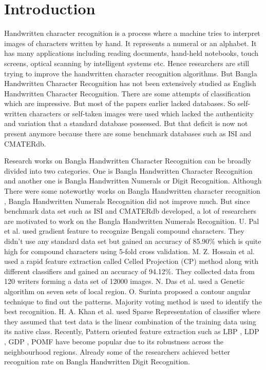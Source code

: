 \documentclass[conference]{IEEEtran}
\begin{document}
\IEEEpeerreviewmaketitle


\section{Introduction}
Handwritten character recognition is a process where a machine tries to interpret images of characters written by hand. It represents a numeral or an alphabet. It has many applications including reading documents, hand-held notebooks, touch screens, optical scanning by intelligent systems etc. Hence researchers are still trying to improve the handwritten character recognition algorithms. But Bangla Handwritten Character Recognition has not been extensively studied as English Handwritten Character Recognition. There are some attempts of classification which are impressive. But most of the papers earlier lacked databases. So self-written characters or self-taken images were used which lacked the authenticity and variation that a standard database possessed. But that deficit is now not present anymore because there are some benchmark databases such as ISI \cite{2006isi} and CMATERdb\cite{2009cmater}.


Research works on Bangla Handwritten Character Recognition can be broadly divided into two categories. One is Bangla Handwritten Character Recognition and another one is Bangla Handwritten Numerals or Digit Recognition. Although There were some noteworthy works on Bangla Handwritten character recognition \cite{1998BHCR, 2004BHCR}, Bangla Handwritten Numerals Recognition did not improve much. But since benchmark data set such as ISI \cite{2006isi} and CMATERdb \cite{2009cmater} developed, a lot of researchers are motivated to work on the Bangla Handwritten Numerals Recognition. U. Pal et al. \cite{2007gradientfeature} used gradient feature to recognize Bengali compound characters. They didn't use any standard data set but gained an accuracy of 85.90\% which is quite high for compound characters using 5-fold cross validation. M. Z. Hossain et al.\cite{2011rapidfeature} used a rapid feature extraction called Celled Projection (CP) method along with different classifiers and gained an accuracy of 94.12\%. They collected data from 120 writers forming a data set of 12000 images. N. Das et al. \cite{2012geneticalgorithm} used a Genetic algorithm on seven sets of local region. O. Surinta \cite{2013contourangular} proposed a contour angular technique to find out the patterns. Majority voting method is used to identify the best recognition. H. A. Khan et al. \cite{2014sparseclassifier} used Sparse Representation of classifier where they assumed that test data is the linear combination of the training data using its native class. Recently, Pattern oriented feature extraction such as LBP \cite{2002LBP}, LDP \cite{2010LDP}, GDP \cite{2012GDP}, POMF \cite{2017POMF} have become popular due to its robustness across the neighbourhood regions. Already some of the researchers \cite{2015LBP} achieved better recognition rate on Bangla Handwritten Digit Recognition.
\end{document}
